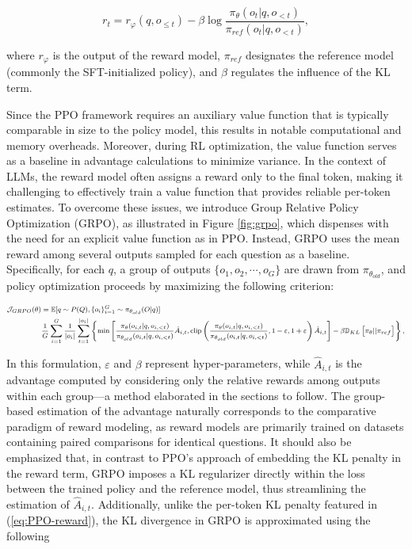\begin{equation}
    r_{t} = r_\varphi(q, o_{\le t}) - \beta \log\frac{\pi_{\theta}(o_{t}|q, o_{<t})}{\pi_{ref}(o_{t}|q, o_{<t})},
\label{eq:PPO-reward}
\end{equation}

where $r_\varphi$ is the output of the reward model, $\pi_{ref}$ designates the reference model (commonly the SFT-initialized policy), and $\beta$ regulates the influence of the KL term.

Since the PPO framework requires an auxiliary value function that is typically comparable in size to the policy model, this results in notable computational and memory overheads. Moreover, during RL optimization, the value function serves as a baseline in advantage calculations to minimize variance. In the context of LLMs, the reward model often assigns a reward only to the final token, making it challenging to effectively train a value function that provides reliable per-token estimates. To overcome these issues, we introduce Group Relative Policy Optimization (GRPO), as illustrated in Figure \ref{fig:grpo}, which dispenses with the need for an explicit value function as in PPO. Instead, GRPO uses the mean reward among several outputs sampled for each question as a baseline. Specifically, for each $q$, a group of outputs $\{o_1, o_2, \cdots, o_G\}$ are drawn from $\pi_{\theta_{old}}$, and policy optimization proceeds by maximizing the following criterion:

\begin{equation}
\footnotesize
\begin{split}
    \mathcal{J}_{GRPO}(\theta) &= \mathbb{E}{[q \sim P(Q), \{o_i\}_{i=1}^G \sim \pi_{\theta_{old}}(O|q)]}  \\
    & \frac{1}{G}\sum_{i=1}^G\frac{1}{|o_i|} \sum_{t=1}^{|o_i|} \left\{ \min \left[ \frac{\pi_\theta(o_{i,t} | q, o_{i,<t})}{\pi_{\theta_{old}}(o_{i,t} | q, o_{i,<t})} \hat{A}_{i,t}, \text{clip} \left( \frac{\pi_\theta(o_{i,t} | q, o_{i,<t})}{\pi_{\theta_{old}}(o_{i,t} | q, o_{i,<t})}, 1 - \varepsilon, 1 + \varepsilon \right)  \hat{A}_{i,t} \right] - \beta \mathbb{D}_{KL}\left[\pi_{\theta} || \pi_{ref}\right]\right\} ,
\end{split}
\label{eq:GRPO-obj}
\end{equation}

In this formulation, $\varepsilon$ and $\beta$ represent hyper-parameters, while $\hat{A}_{i,t}$ is the advantage computed by considering only the relative rewards among outputs within each group—a method elaborated in the sections to follow. The group-based estimation of the advantage naturally corresponds to the comparative paradigm of reward modeling, as reward models are primarily trained on datasets containing paired comparisons for identical questions. It should also be emphasized that, in contrast to PPO’s approach of embedding the KL penalty in the reward term, GRPO imposes a KL regularizer directly within the loss between the trained policy and the reference model, thus streamlining the estimation of $\hat{A}_{i,t}$. Additionally, unlike the per-token KL penalty featured in (\ref{eq:PPO-reward}), the KL divergence in GRPO is approximated using the following

